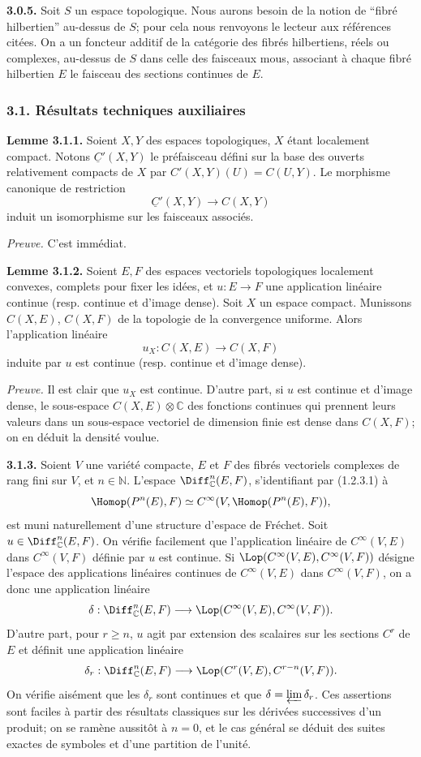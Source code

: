 \documentclass[11pt]{article}
\providecommand{\N}{\mathbb N}
\begin{document}
\textbf{3.0.5.} Soit $S$ un espace topologique. Nous aurons besoin de la notion de ``fibré hilbertien'' au-dessus de $S$; pour cela nous renvoyons le lecteur aux références citées. On a un foncteur additif de la catégorie des fibrés hilbertiens, réels ou complexes, au-dessus de $S$ dans celle des faisceaux mous, associant à chaque fibré hilbertien $E$ le faisceau des sections continues de $E$.

\subsubsection*{3.1. Résultats techniques auxiliaires}
\textbf{Lemme 3.1.1.} Soient $X,Y$ des espaces topologiques, $X$ étant localement compact. Notons $\underline C'(X,Y)$ le préfaisceau défini sur la base des ouverts relativement compacts de $X$ par $C'(X,Y)(U)=C(U,Y)$. Le morphisme canonique de restriction
\[
  \underline C'(X,Y)\longrightarrow C(X,Y)
\]
induit un isomorphisme sur les faisceaux associés.

\emph{Preuve.} C'est immédiat.

\textbf{Lemme 3.1.2.} Soient $E,F$ des espaces vectoriels topologiques localement convexes, complets pour fixer les idées, et $u:E\to F$ une application linéaire continue (resp. continue et d'image dense). Soit $X$ un espace compact. Munissons $C(X,E)$, $C(X,F)$ de la topologie de la convergence uniforme. Alors l'application linéaire
\[
  u_X:C(X,E)\longrightarrow C(X,F)
\]
induite par $u$ est continue (resp. continue et d'image dense).

\emph{Preuve.} Il est clair que $u_X$ est continue. D'autre part, si $u$ est continue et d'image dense, le sous-espace $C(X,E)\otimes\mathbb C$ des fonctions continues qui prennent leurs valeurs dans un sous-espace vectoriel de dimension finie est dense dans $C(X,F)$; on en déduit la densité voulue.

\textbf{3.1.3.} Soient $V$ une variété compacte, $E$ et $F$ des fibrés vectoriels complexes de rang fini sur $V$, et $n\in\N$. L'espace $\Diff^n_\mathbb C(E,F)$, s'identifiant par (1.2.3.1) à
\[
  \Homop(P^n(E),F)\simeq C^\infty(V,\Homop(P^n(E),F)),
\]
est muni naturellement d'une structure d'espace de Fréchet. Soit $u\in\Diff^n_\mathbb C(E,F)$. On vérifie facilement que l'application linéaire de $C^\infty(V,E)$ dans $C^\infty(V,F)$ définie par $u$ est continue. Si $\Lop(C^\infty(V,E),C^\infty(V,F))$ désigne l'espace des applications linéaires continues de $C^\infty(V,E)$ dans $C^\infty(V,F)$, on a donc une application linéaire
\[
  \delta:\Diff^n_\mathbb C(E,F)
  \longrightarrow \Lop(C^\infty(V,E),C^\infty(V,F)).
\]
D'autre part, pour $r\ge n$, $u$ agit par extension des scalaires sur les sections $C^r$ de $E$ et définit une application linéaire
\[
  \delta_r:\Diff^n_\mathbb C(E,F)
  \longrightarrow \Lop(C^r(V,E),C^{r-n}(V,F)).
\]
On vérifie aisément que les $\delta_r$ sont continues et que $\delta=\varprojlim\delta_r$. Ces assertions sont faciles à partir des résultats classiques sur les dérivées successives d'un produit; on se ramène aussitôt à $n=0$, et le cas général se déduit des suites exactes de symboles et d'une partition de l'unité.
\end{document}
